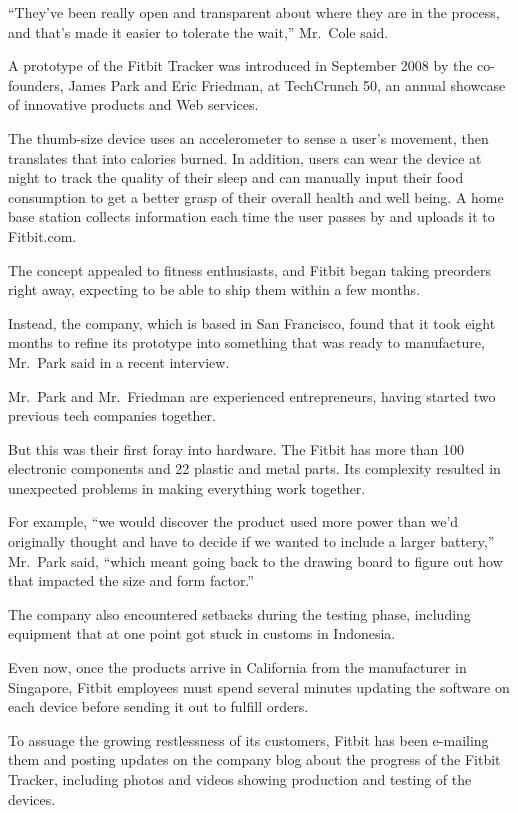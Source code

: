 ﻿\documentclass[12pt]{article}
\begin{document}
``They've been really open and transparent about where they are in the process, and that's made it
easier to tolerate the wait,'' Mr.~Cole said.

A prototype of the Fitbit Tracker was introduced in September 2008 by the co-founders, James Park
and Eric Friedman, at TechCrunch 50, an annual showcase of innovative products and Web services.

The thumb-size device uses an accelerometer to sense a user's movement, then translates that into
calories burned. In addition, users can wear the device at night to track the quality of their sleep
and can manually input their food consumption to get a better grasp of their overall health and well
being. A home base station collects information each time the user passes by and uploads it to
Fitbit.com.

The concept appealed to fitness enthusiasts, and Fitbit began taking preorders right away, expecting
to be able to ship them within a few months.

Instead, the company, which is based in San Francisco, found that it took eight months to refine its
prototype into something that was ready to manufacture, Mr.~Park said in a recent interview.

Mr.~Park and Mr.~Friedman are experienced entrepreneurs, having started two previous tech companies
together.

But this was their first foray into hardware. The Fitbit has more than 100 electronic components and
22 plastic and metal parts. Its complexity resulted in unexpected problems in making everything work
together.

For example, ``we would discover the product used more power than we'd originally thought and have
to decide if we wanted to include a larger battery,'' Mr.~Park said, ``which meant going back to the
drawing board to figure out how that impacted the size and form factor.''

The company also encountered setbacks during the testing phase, including equipment that at one
point got stuck in customs in Indonesia.

Even now, once the products arrive in California from the manufacturer in Singapore, Fitbit
employees must spend several minutes updating the software on each device before sending it out to
fulfill orders.

To assuage the growing restlessness of its customers, Fitbit has been e-mailing them and posting
updates on the company blog about the progress of the Fitbit Tracker, including photos and videos
showing production and testing of the devices.
\end{document}
